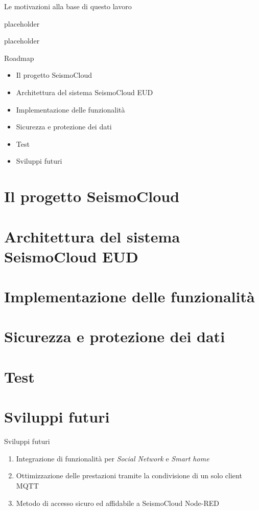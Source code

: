 \begin{frame}[c]{Le motivazioni alla base di questo lavoro}

placeholder

\vspace{0.5cm}
placeholder

\end{frame}

\begin{frame}[c]{Roadmap}

\begin{itemize}
\item Il progetto SeismoCloud
\item Architettura del sistema SeismoCloud EUD
\item Implementazione delle funzionalità
\item Sicurezza e protezione dei dati
\item Test
\item Sviluppi futuri
\end{itemize}

\end{frame}

\section{Il progetto SeismoCloud}

\section{Architettura del sistema SeismoCloud EUD}

\section{Implementazione delle funzionalità}

\section{Sicurezza e protezione dei dati}

\section{Test}

\section{Sviluppi futuri}

\begin{frame}[c]{Sviluppi futuri}

\begin{enumerate}
	\item Integrazione di funzionalità per \textit{Social Network} e \textit{Smart home}
	\item Ottimizzazione delle prestazioni tramite la condivisione di un solo client MQTT
	\item Metodo di accesso sicuro ed affidabile a SeismoCloud Node-RED
\end{enumerate}

\end{frame}

